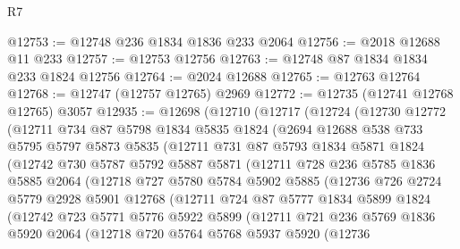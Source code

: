 \begin{lexlean}{R7}
\begin{coremodule}
@12753 := @12748 @236 @1834 @1836 @233 @2064
@12756 := @2018 @12688 @11 @233
@12757 := @12753 @12756
@12763 := @12748 @87 @1834 @1834 @233 @1824 @12756
@12764 := @2024 @12688
@12765 := @12763 @12764
@12768 := @12747 (@12757 @12765) @2969
@12772 := @12735 (@12741 @12768 @12765) @3057
@12935 := @12698
    (@12710
      (@12717
        (@12724
          (@12730
            @12772
            (@12711
              @734
              @87
              @5798
              @1834
              @5835
              @1824
              (@2694
                @12688
                @538
                @733
                @5795
                @5797
                @5873
                @5835
                (@12711
                  @731
                  @87
                  @5793
                  @1834
                  @5871
                  @1824
                  (@12742
                    @730
                    @5787
                    @5792
                    @5887
                    @5871
                    (@12711
                      @728
                      @236
                      @5785
                      @1836
                      @5885
                      @2064
                      (@12718
                        @727
                        @5780
                        @5784
                        @5902
                        @5885
                        (@12736
                          @726
                          @2724
                          @5779
                          @2928
                          @5901
                          @12768
                          (@12711
                            @724
                            @87
                            @5777
                            @1834
                            @5899
                            @1824
                            (@12742
                              @723
                              @5771
                              @5776
                              @5922
                              @5899
                              (@12711
                                @721
                                @236
                                @5769
                                @1836
                                @5920
                                @2064
                                (@12718
                                  @720
                                  @5764
                                  @5768
                                  @5937
                                  @5920
                                  (@12736

\end{coremodule}
\end{lexlean}

